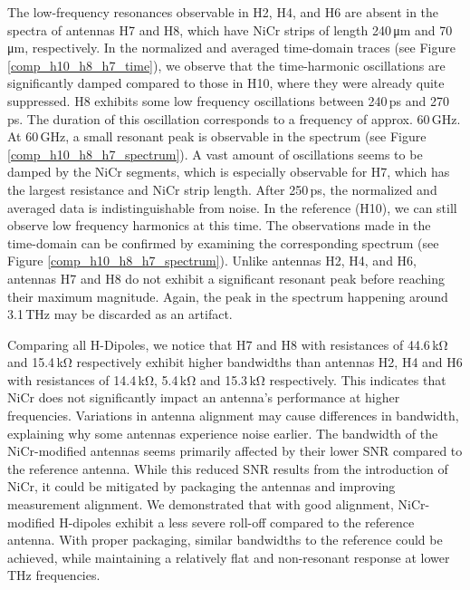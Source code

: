 The low-frequency resonances observable in H2, H4, and H6 are absent in the spectra of antennas H7 and H8, which have NiCr strips of length \num{240}\,\si{\micro \meter} and \num{70}\,\si{\micro \meter}, respectively. In the normalized and averaged time-domain traces (see Figure \ref{comp_h10_h8_h7_time}), we observe that the time-harmonic oscillations are significantly damped compared to those in H10, where they were already quite suppressed. H8 exhibits some low frequency oscillations between \num{240}\,\si{\pico \s} and \num{270}\,\si{\pico \s}. The duration of this oscillation corresponds to a frequency of approx. \num{60}\,\si{\giga \hertz}. At \num{60}\,\si{\giga \hertz}, a small resonant peak is observable in the spectrum (see Figure \ref{comp_h10_h8_h7_spectrum}). A vast amount of oscillations seems to be damped by the NiCr segments, which is especially observable for H7, which has the largest resistance and NiCr strip length. After \num{250}\,\si{\pico \s}, the normalized and averaged data is indistinguishable from noise. In the reference (H10), we can still observe low frequency harmonics at this time. The observations made in the time-domain can be confirmed by examining the corresponding spectrum (see Figure \ref{comp_h10_h8_h7_spectrum}). Unlike antennas H2, H4, and H6, antennas H7 and H8 do not exhibit a significant resonant peak before reaching their maximum magnitude. Again, the peak in the spectrum happening around \num{3.1}\,\si{\tera \hertz} may be discarded as an artifact.

Comparing all H-Dipoles, we notice that H7 and H8 with resistances of \num{44.6}\,\si{\kilo \ohm} and \num{15.4}\,\si{\kilo \ohm} respectively exhibit higher bandwidths than antennas H2, H4 and H6 with resistances of \num{14.4}\,\si{\kilo \ohm}, \num{5.4}\,\si{\kilo \ohm} and \num{15.3}\,\si{\kilo \ohm} respectively. This indicates that NiCr does not significantly impact an antenna’s performance at higher frequencies. Variations in antenna alignment may cause differences in bandwidth, explaining why some antennas experience noise earlier. The bandwidth of the NiCr-modified antennas seems primarily affected by their lower SNR compared to the reference antenna. While this reduced SNR results from the introduction of NiCr, it could be mitigated by packaging the antennas and improving measurement alignment. We demonstrated that with good alignment, NiCr-modified H-dipoles exhibit a less severe roll-off compared to the reference antenna. With proper packaging, similar bandwidths to the reference could be achieved, while maintaining a relatively flat and non-resonant response at lower THz frequencies.

